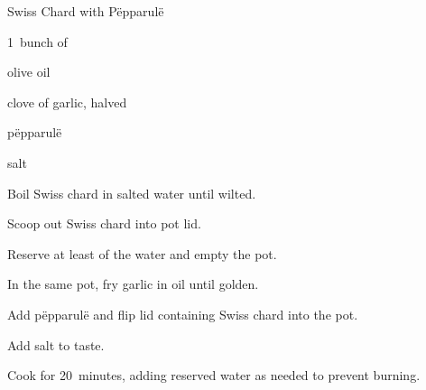\begin{recipe}{Swiss Chard with Pëpparulë}{}{}

\begin{ingredients}
\item 1~bunch of 
\item olive oil
\item clove of garlic, halved
\item pëpparulë
\item salt
\end{ingredients}

\begin{directions}
\item Boil Swiss chard in salted water until wilted.
\item Scoop out Swiss chard into pot lid.
\item Reserve at least  of the water and empty the pot.
\item In the same pot, fry garlic in oil until golden.
\item Add pëpparulë and flip lid containing Swiss chard into the pot.
\item Add salt to taste.
\item Cook for 20~minutes, adding reserved water as needed to prevent burning.
\end{directions}

\end{recipe}
